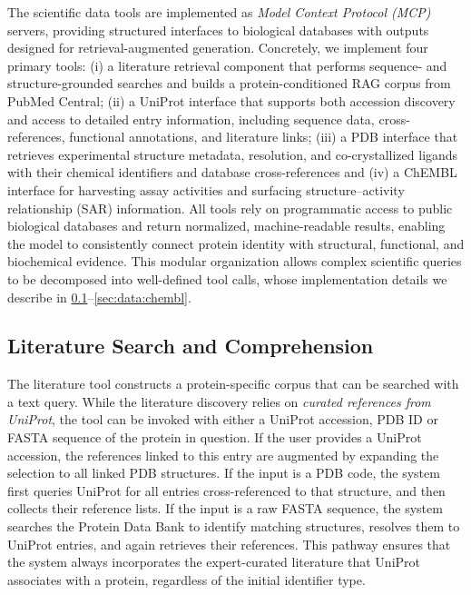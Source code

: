 \documentclass{article}
\begin{document}
The scientific data tools are implemented as \emph{Model Context Protocol (MCP)}~\citep{anthropic_introducing_2024} servers, providing structured interfaces to biological databases with outputs designed for retrieval-augmented generation. Concretely, we implement four primary tools: (i) a literature retrieval component that performs sequence- and structure-grounded searches and builds a protein-conditioned RAG corpus from PubMed Central; (ii) a UniProt interface that supports both accession discovery and access to detailed entry information, including sequence data, cross-references, functional annotations, and literature links; (iii) a PDB interface that retrieves experimental structure metadata, resolution, and co-crystallized ligands with their chemical identifiers and database cross-references and (iv) a ChEMBL interface for harvesting assay activities and surfacing structure–activity relationship (SAR) information. All tools rely on programmatic access to public biological databases and return normalized, machine-readable results, enabling the model to consistently connect protein identity with structural, functional, and biochemical evidence. This modular organization allows complex scientific queries to be decomposed into well-defined tool calls, whose implementation details we describe in \cref{sec:data:literature}--\ref{sec:data:chembl}.


\subsection{Literature Search and Comprehension}\label{sec:data:literature}
The literature tool constructs a protein-specific corpus that can be searched with a text query. While the literature discovery relies on \emph{curated references from UniProt}, the tool can be invoked with either a UniProt accession, PDB ID or FASTA sequence of the protein in question. If the user provides a UniProt accession, the references linked to this entry are augmented by expanding the selection to all linked PDB structures. If the input is a PDB code, the system first queries UniProt for all entries cross-referenced to that structure, and then collects their reference lists. If the input is a raw FASTA sequence, the system searches the Protein Data Bank to identify matching structures, resolves them to UniProt entries, and again retrieves their references. This pathway ensures that the system always incorporates the expert-curated literature that UniProt associates with a protein, regardless of the initial identifier type.
\end{document}

